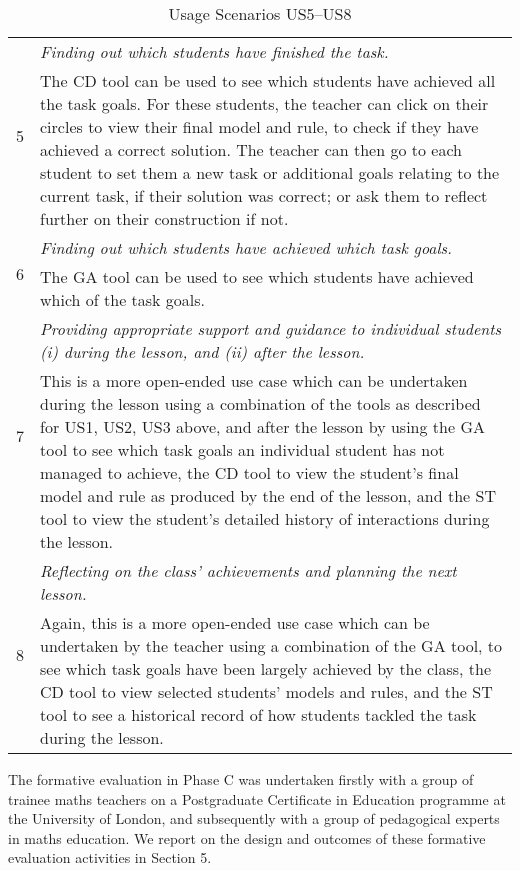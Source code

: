 \begin{table}[htbp]
  \begin{tabular}{|p{0.5cm}|p{12.5cm}|}
  \hline \multirow{2}{*}{5}
  & \emph{Finding out which students have finished the task.} \\
  \cline{2-2}
  & The CD tool can be used to see which students have achieved all
  the task goals. For these students, the teacher can click on their
  circles to view their final model and rule, to check if they have
  achieved a correct solution. The teacher can then go to each student
  to set them a new task or additional goals relating to the current
  task, if their solution was correct; or ask them to reflect further
  on their construction if not. \\
  \hline \multirow{2}{*}{6}
  & \emph{Finding out which students have achieved which task goals.} \\
  \cline{2-2}
  & The GA tool can be used to see which students have achieved which
  of the task goals. \\
  \hline \multirow{2}{*}{7}
  & \emph{Providing appropriate support and guidance to individual
  students (i) during the lesson, and (ii) after the lesson.} \\
  \cline{2-2}
  &  This is a more open-ended use case which can be undertaken during
  the lesson using a combination of the tools as described for US1,
  US2, US3 above, and after the lesson by using the GA tool to see
  which task goals an individual student has not managed to achieve,
  the CD tool to view the student's final model and rule as produced
  by the end of the lesson, and the ST tool to view the student's
  detailed history of interactions
  during the lesson.  \\
  \hline \multirow{2}{*}{8}
  & \emph{Reflecting on the class' achievements and planning the next
  lesson.} \\
  \cline{2-2}
  &  Again, this is a more open-ended use case which can be undertaken by
  the teacher using a combination of the GA tool, to see which task
  goals have been largely achieved by the class, the CD tool to view
  selected students' models and rules, and the ST tool to see a
  historical record of how students tackled the task during the
  lesson.
   \\
  \hline
  \end{tabular}
  \caption{Usage Scenarios US5--US8}
  \label{tab:UsageScenariosB}
\end{table}
 

The formative evaluation in Phase C was undertaken firstly with a group of trainee
maths teachers on a Postgraduate Certificate in Education programme
at the University of London, and subsequently with a group of pedagogical 
experts in maths education. We report on the design and outcomes of these formative
evaluation activities in Section 5.
 
